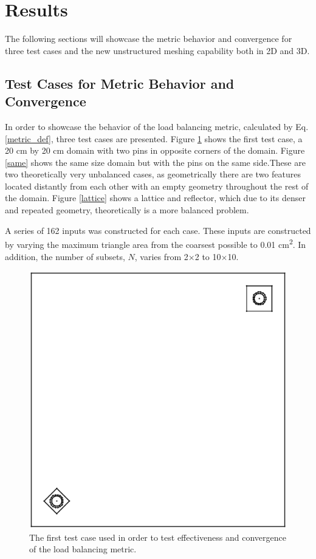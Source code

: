 \documentclass{anstrans}
\begin{document}
\section{Results}
\label{ch:results}
The following sections will showcase the metric behavior and convergence for three test cases and the new unstructured meshing capability both in 2D and 3D.

\subsection{Test Cases for Metric Behavior and Convergence}
\label{sec:convergence}
In order to showcase the behavior of the load balancing metric, calculated by Eq.\ref{metric_def}, three test cases are presented. Figure \ref{opp} shows the first test case, a 20 cm by 20 cm domain with two pins in opposite corners of the domain. Figure \ref{same} shows the same size domain but with the pins on the same side.These are two theoretically very unbalanced cases, as geometrically there are two features located distantly from each other with an empty geometry throughout the rest of the domain. Figure \ref{lattice} shows a lattice and reflector, which due to its denser and repeated geometry, theoretically is a more balanced problem. 

A series of 162 inputs was constructed for each case. These inputs are constructed by varying the maximum triangle area from the coarsest possible to 0.01 cm\textsuperscript{2}. In addition, the number of subsets, $N$, varies from 2$\times$2 to 10$\times$10. 

\begin{figure}[H]
\centering
\includegraphics[scale = 0.5,trim = {0, 0, 0, 0}, clip]{figures/unbalanced_lattice.eps}
\caption{The first test case used in order to test effectiveness and convergence of the load balancing metric.}
\label{opp}
\end{figure}
\end{document}
